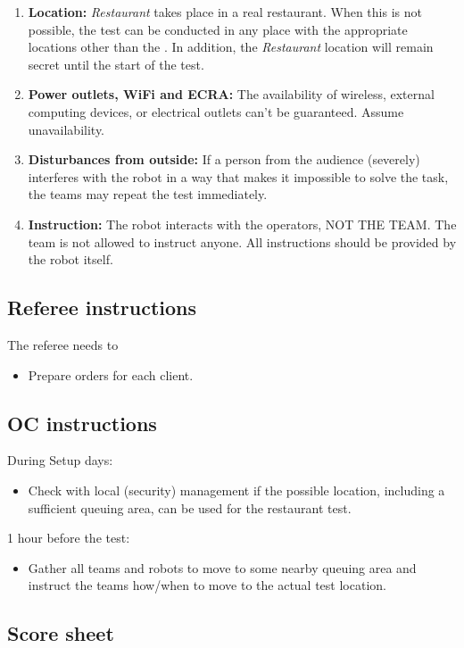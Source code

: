 \begin{enumerate}[nosep]
	\item \textbf{Location:} \emph{Restaurant} takes place in a real restaurant.
	When this is not possible, the test can be conducted in any place with the appropriate locations other than the \Arena{}.
	In addition, the \emph{Restaurant} location will remain secret until the start of the test.

	\item \textbf{Power outlets, WiFi and ECRA:} The availability of wireless, external computing devices, or electrical outlets can't be guaranteed. Assume unavailability.

	\item \textbf{Disturbances from outside:} If a person from the audience (severely) interferes with the robot in a way that makes it impossible to solve the task, the teams may repeat the test immediately.

	\item \textbf{Instruction:} The robot interacts with the operators, NOT THE TEAM.
	The team is not allowed to instruct anyone.
	All instructions should be provided by the robot itself.

\end{enumerate}

\subsection*{Referee instructions}

The referee needs to
\begin{itemize}
	\item Prepare orders for each client.
\end{itemize}

\subsection*{OC instructions}
During Setup days:
\begin{itemize}[nosep]
	\item Check with local (security) management if the possible location, including a sufficient queuing area, can be used for the restaurant test.
\end{itemize}

1 hour before the test:
\begin{itemize}[nosep]
	\item Gather all teams and robots to move to some nearby queuing area and instruct the teams how/when to move to the actual test location.
\end{itemize}

\newpage
\subsection*{Score sheet}


\cleardoublepage



